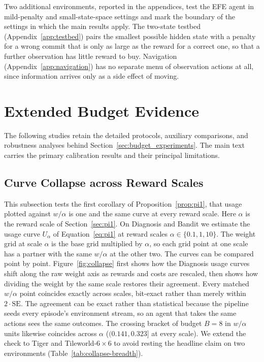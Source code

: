 Two additional environments, reported in the appendices, test the EFE agent in mild-penalty and small-state-space settings and mark the boundary of the settings in which the main results apply. The two-state testbed (Appendix~\ref{app:testbed}) pairs the smallest possible hidden state with a penalty for a wrong commit that is only as large as the reward for a correct one, so that a further observation has little reward to buy. Navigation (Appendix~\ref{app:navigation}) has no separate menu of observation actions at all, since information arrives only as a side effect of moving.

\section{Extended Budget Evidence}
\label{app:extended_budget_evidence}

The following studies retain the detailed protocols, auxiliary comparisons, and robustness analyses behind Section~\ref{sec:budget_experiments}. The main text carries the primary calibration results and their principal limitations.

\subsection{Curve Collapse across Reward Scales}
\label{app:scale_details}

This subsection tests the first corollary of Proposition~\ref{prop:pi1}, that usage plotted against $w/\alpha$ is one and the same curve at every reward scale. Here $\alpha$ is the reward scale of Section~\ref{sec:pi1}. On Diagnosis and Bandit we estimate the usage curve $U_\alpha$ of Equation~\ref{eq:pi1} at reward scales $\alpha \in \{0.1, 1, 10\}$. The weight grid at scale $\alpha$ is the base grid multiplied by $\alpha$, so each grid point at one scale has a partner with the same $w/\alpha$ at the other two. The curves can be compared point by point. Figure~\ref{fig:collapse} first shows how the Diagnosis usage curves shift along the raw weight axis as rewards and costs are rescaled, then shows how dividing the weight by the same scale restores their agreement. Every matched $w/\alpha$ point coincides exactly across scales, bit-exact rather than merely within $2\cdot\mathrm{SE}$. The agreement can be exact rather than statistical because the pipeline seeds every episode's environment stream, so an agent that takes the same actions sees the same outcomes. The crossing bracket of budget $B{=}8$ in $w/\alpha$ units likewise coincides across $\alpha$ ($(0.141, 0.323]$ at every scale). We extend the check to Tiger and Tileworld-$6{\times}6$ to avoid resting the headline claim on two environments (Table~\ref{tab:collapse-breadth}).

